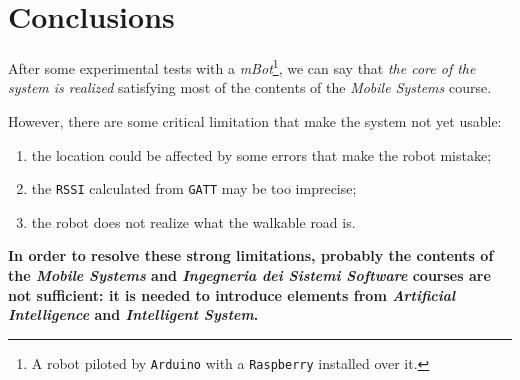 \section{Conclusions}

After some experimental tests with a \textit{mBot}\footnote{A robot piloted by \texttt{Arduino} with a \texttt{Raspberry} installed over it.}, we can say that \textit{the core of the system is realized} satisfying most of the contents of the \textit{Mobile Systems} course.

However, there are some critical limitation that make the system not yet usable:
\begin{enumerate}
	\item the location could be affected by some errors that make the robot mistake;
	\item the \texttt{RSSI} calculated from \texttt{GATT} may be too imprecise;
	\item the robot does not realize what the walkable road is.
\end{enumerate}

\begin{tcolorbox}
	\begin{center}
		\textbf{
			In order to resolve these strong limitations, probably the contents of the \textit{Mobile Systems} and \textit{Ingegneria dei Sistemi Software} courses are not sufficient: it is needed to introduce elements from \textit{Artificial Intelligence} and \textit{Intelligent System}.
		}
	\end{center}
\end{tcolorbox}